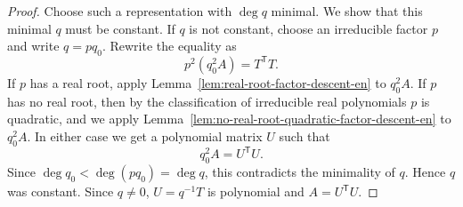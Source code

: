 \documentclass[uplatex,dvipdfmx]{jsarticle}
\newcommand{\restateprefix}{}
\theoremstyle{matrixsosdefinition}
\begin{document}
\begin{proof}
  Choose such a representation with \(\deg q\) minimal. We show that this
  minimal \(q\) must be constant. If \(q\) is not constant,
  choose an irreducible factor \(p\) and write
  \(q=pq_0\).  Rewrite the equality as
  \[
    p^2(q_0^2A)=T^{\mathsf T}T.
  \]
  If \(p\) has a real root, apply
  Lemma~\ref{lem:real-root-factor-descent-en} to \(q_0^2A\).  If
  \(p\) has no real root, then by the classification of irreducible real
  polynomials \(p\) is quadratic, and we apply
  Lemma~\ref{lem:no-real-root-quadratic-factor-descent-en} to
  \(q_0^2A\).  In either case we get a polynomial matrix \(U\) such
  that
  \[
    q_0^2A=U^{\mathsf T}U.
  \]
  Since \(\deg q_0<\deg(pq_0)=\deg q\), this contradicts the
  minimality of \(q\). Hence \(q\) was constant. Since \(q\ne0\),
  \(U=q^{-1}T\) is polynomial and \(A=U^{\mathsf T}U\).
\end{proof}

{\renewcommand{\restateprefix}{Restated; }\fullLineMatrixSOS*}
\end{document}
